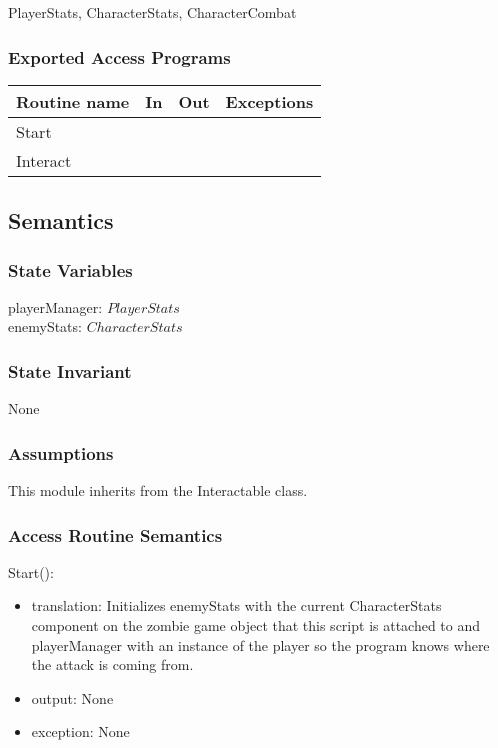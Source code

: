 \documentclass[12pt]{article}
\begin{document}
PlayerStats, CharacterStats, CharacterCombat

\subsubsection* {Exported Access Programs}

\begin{tabular}{| l | l | l | l |}
\hline
\textbf{Routine name} & \textbf{In} & \textbf{Out} & \textbf{Exceptions}\\
\hline
Start & ~ & ~  & ~\\
Interact & ~ & ~ & ~\\
\hline
\end{tabular}

\subsection* {Semantics}

\subsubsection* {State Variables}

playerManager: $PlayerStats$\\
enemyStats: $CharacterStats$\\

\subsubsection* {State Invariant}

None

\subsubsection* {Assumptions}

This module inherits from the Interactable class.

\subsubsection* {Access Routine Semantics}

\noindent Start():
\begin{itemize}
\item translation: Initializes enemyStats with the current CharacterStats component on the zombie game object that this script is attached to and playerManager with an instance of the player so the program knows where the attack is coming from.
\item output: None
\item exception: None
\end{itemize}
\end{document}
